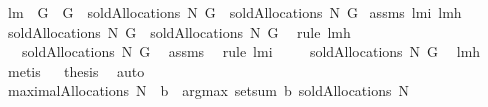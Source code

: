 \begin{isabellebody}
%
\endisadelimproof
\isanewline
{}\isamarkupfalse%
\ lm{}{}{\isacharcolon}\ \ {\isachardoublequoteopen}G{}\ {\isasymsubseteq}\ G{}{\isachardoublequoteclose}\ \ {\isachardoublequoteopen}soldAllocations{\isacharprime}{\isacharprime}\ N\ G{}\ {\isasymsubseteq}\ soldAllocations{\isacharprime}{\isacharprime}\ N\ G{}{\isachardoublequoteclose}\isanewline
%
\isadelimproof
%
\endisadelimproof
%
\isatagproof
{}\isamarkupfalse%
\ assms\ lm{}{}i\ lm{}{}h\ \isanewline
{}\isamarkupfalse%
\ {\isacharminus}\isanewline
{}\isamarkupfalse%
\ {\isachardoublequoteopen}soldAllocations{\isacharprime}{\isacharprime}\ N\ G{}\ {\isacharequal}\ soldAllocations{\isacharprime}{\isacharprime}{\isacharprime}\ N\ G{}{\isachardoublequoteclose}\ \isamarkupfalse%
\ {\isacharparenleft}rule\ lm{}{}h{\isacharparenright}\isanewline
{}\isamarkupfalse%
\ \isamarkupfalse%
\ {\isachardoublequoteopen}{\isachardot}{\isachardot}{\isachardot}\ {\isasymsubseteq}\ soldAllocations{\isacharprime}{\isacharprime}{\isacharprime}\ N\ G{}{\isachardoublequoteclose}\ \isamarkupfalse%
\ assms{\isacharparenleft}{}{\isacharparenright}\ \isamarkupfalse%
\ {\isacharparenleft}rule\ lm{}{}i{\isacharparenright}\isanewline
{}\isamarkupfalse%
\ \isamarkupfalse%
\ {\isachardoublequoteopen}{\isachardot}{\isachardot}{\isachardot}\ {\isacharequal}\ soldAllocations{\isacharprime}{\isacharprime}\ N\ G{}{\isachardoublequoteclose}\ \isamarkupfalse%
\ lm{}{}h\ \isamarkupfalse%
\ metis\isanewline
{}\isamarkupfalse%
\ \isamarkupfalse%
\ {\isacharquery}thesis\ \isamarkupfalse%
\ auto\isanewline
{}\isamarkupfalse%
%
\endisatagproof
{\isafoldproof}%
%
\isadelimproof
\isanewline
%
\endisadelimproof
\isanewline
{}\isamarkupfalse%
\ {\isachardoublequoteopen}maximalAllocations{\isacharprime}{\isacharprime}\ N\ {\isasymOmega}\ b\ {\isacharequal}{\isacharequal}\ argmax\ {\isacharparenleft}setsum\ b{\isacharparenright}\ {\isacharparenleft}soldAllocations\ N\ {\isasymOmega}{\isacharparenright}{\isachardoublequoteclose}\isanewline
\isanewline
{}\isamarkupfalse%

\end{isabellebody}
